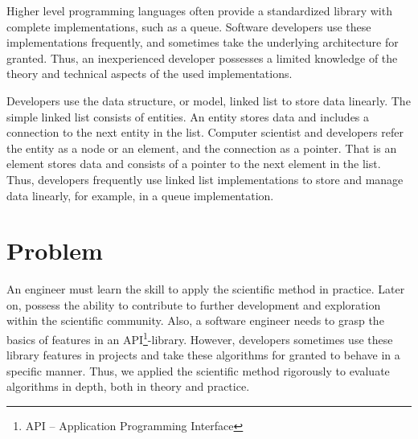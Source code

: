 \documentclass[a4paper,11pt]{kth-mag}
\newcommand*{\skippara}{\par\vspace{\baselineskip} \noindent}
\begin{document}
\skippara Higher level programming languages often provide a standardized library with complete implementations, such as a queue.
Software developers use these implementations frequently, and sometimes take the underlying architecture for granted.
Thus, an inexperienced developer possesses a limited knowledge of the theory and technical aspects of the used implementations.

\skippara Developers use the data structure, or model, linked list to store data linearly.
The simple linked list consists of entities.
An entity stores data and includes a connection to the next entity in the list.
Computer scientist and developers refer the entity as a node or an element, and the connection as a pointer.
That is an element stores data and consists of a pointer to the next element in the list.
Thus, developers frequently use linked list implementations to store and manage data linearly, for example, in a queue implementation.


\section{Problem}\label{sec:problem}
An engineer must learn the skill to apply the scientific method in practice.
Later on, possess the ability to contribute to further development and exploration within the scientific community.
Also, a software engineer needs to grasp the basics of features in an API\footnote{API -- Application Programming Interface}-library.
However, developers sometimes use these library features in projects and take these algorithms for granted to behave in a specific manner.
Thus, we applied the scientific method rigorously to evaluate algorithms in depth, both in theory and practice.
\end{document}
